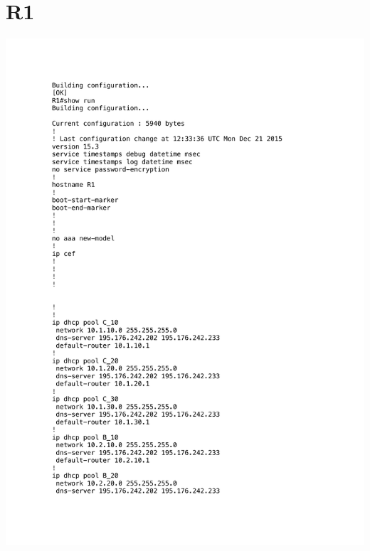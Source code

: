 \documentclass[11pt,a4paper]{scrreprt}
\begin{document}
\section{R1}
\vspace{-1cm}
\includegraphics[height=\dimexpr\textheight-4\baselineskip\relax,page=1]{../config_files/R1.pdf}

\end{document}
